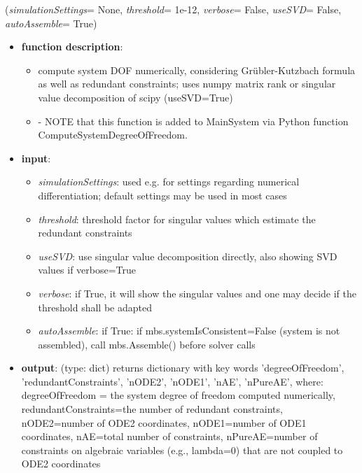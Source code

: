 \ei

%
\begin{flushleft}
\label{sec:mainsystemextensions:ComputeSystemDegreeOfFreedom}
({\it simulationSettings}= None, {\it threshold}= 1e-12, {\it verbose}= False, {\it useSVD}= False, {\it autoAssemble}= True)
\end{flushleft}
\setlength{\itemindent}{0.7cm}
\begin{itemize}[leftmargin=0.7cm]
\item[--]
{\bf function description}: \vspace{-6pt}
\begin{itemize}[leftmargin=1.2cm]
\setlength{\itemindent}{-0.7cm}
\item[]compute system DOF numerically, considering Grübler-Kutzbach formula as well as redundant constraints; uses numpy matrix rank or singular value decomposition of scipy (useSVD=True)
\item[]- NOTE that this function is added to MainSystem via Python function ComputeSystemDegreeOfFreedom.
\end{itemize}
\item[--]
{\bf input}: \vspace{-6pt}
\begin{itemize}[leftmargin=1.2cm]
\setlength{\itemindent}{-0.7cm}
\item[]{\it simulationSettings}: used e.g. for settings regarding numerical differentiation; default settings may be used in most cases
\item[]{\it threshold}: threshold factor for singular values which estimate the redundant constraints
\item[]{\it useSVD}: use singular value decomposition directly, also showing SVD values if verbose=True
\item[]{\it verbose}: if True, it will show the singular values and one may decide if the threshold shall be adapted
\item[]{\it autoAssemble}: if True: if mbs.systemIsConsistent=False (system is not assembled), call mbs.Assemble() before solver calls
\end{itemize}
\item[--]
{\bf output}: (type: dict) returns dictionary with key words 'degreeOfFreedom', 'redundantConstraints', 'nODE2', 'nODE1', 'nAE', 'nPureAE', where: degreeOfFreedom = the system degree of freedom computed numerically, redundantConstraints=the number of redundant constraints, nODE2=number of ODE2 coordinates, nODE1=number of ODE1 coordinates, nAE=total number of constraints, nPureAE=number of constraints on algebraic variables (e.g., lambda=0) that are not coupled to ODE2 coordinates

\end{itemize}
